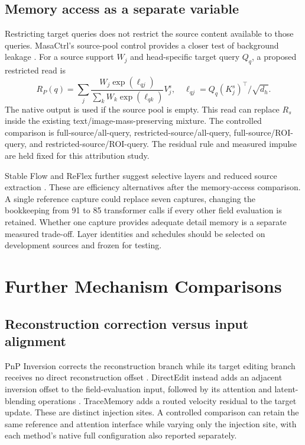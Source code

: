 \documentclass[conference]{IEEEtran}
\begin{document}
\subsection{Memory access as a separate variable}
Restricting target queries does not restrict the source content available to those queries. MasaCtrl's source-pool control provides a closer test of background leakage \cite{cao2023masactrl}. For a source support $W_j$ and head-specific target query $Q_q$, a proposed restricted read is
\begin{equation}
R_P(q)=\sum_j\frac{W_j\exp(\ell_{qj})}{\sum_k W_k\exp(\ell_{qk})}V_j^s,
\quad \ell_{qj}=Q_q(K_j^s)^\top/\sqrt{d_h}.
\end{equation}
The native output is used if the source pool is empty. This read can replace $R_s$ inside the existing text/image-mass-preserving mixture. The controlled comparison is full-source/all-query, restricted-source/all-query, full-source/ROI-query, and restricted-source/ROI-query. The residual rule and measured impulse are held fixed for this attribution study.

Stable Flow and ReFlex further suggest selective layers and reduced source extraction \cite{avrahami2025stableflow,kim2025reflex}. These are efficiency alternatives after the memory-access comparison. A single reference capture could replace seven captures, changing the bookkeeping from 91 to 85 transformer calls if every other field evaluation is retained. Whether one capture provides adequate detail memory is a separate measured trade-off. Layer identities and schedules should be selected on development sources and frozen for testing.



\section{Further Mechanism Comparisons}
\label{sec:mechanism-appendix}
\subsection{Reconstruction correction versus input alignment}
PnP Inversion corrects the reconstruction branch while its target editing branch receives no direct reconstruction offset \cite{ju2024pnpinversion}. DirectEdit instead adds an adjacent inversion offset to the field-evaluation input, followed by its attention and latent-blending operations \cite{yang2026directedit}. TraceMemory adds a routed velocity residual to the target update. These are distinct injection sites. A controlled comparison can retain the same reference and attention interface while varying only the injection site, with each method's native full configuration also reported separately.
\end{document}
